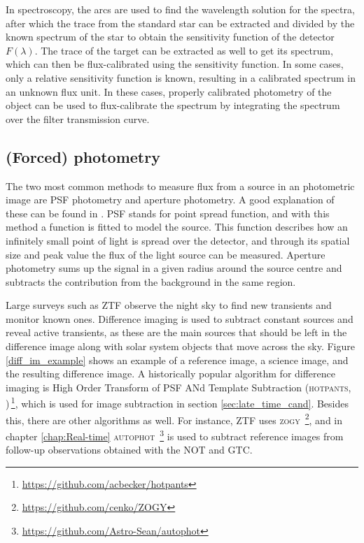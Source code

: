 \documentclass[a4paper,oneside,12pt, class=Latex/Classes/PhDthesisPSnPDF, crop=false]{standalone}
\begin{document}
In spectroscopy, the arcs are used to find the wavelength solution for the spectra, after which the trace from the standard star can be extracted and divided by the known spectrum of the star to obtain the sensitivity function of the detector $F(\lambda)$. The trace of the target can be extracted as well to get its spectrum, which can then be flux-calibrated using the sensitivity function. In some cases, only a relative sensitivity function is known, resulting in a calibrated spectrum in an unknown flux unit. In these cases, properly calibrated photometry of the object can be used to flux-calibrate the spectrum by integrating the spectrum over the filter transmission curve.


\subsection{(Forced) photometry}
The two most common methods to measure flux from a source in an photometric image are PSF photometry and aperture photometry. A good explanation of these can be found in \citet{Photometry_techniques}. PSF stands for point spread function, and with this method a function is fitted to model the source. This function describes how an infinitely small point of light is spread over the detector, and through its spatial size and peak value the flux of the light source can be measured. Aperture photometry sums up the signal in a given radius around the source centre and subtracts the contribution from the background in the same region.

Large surveys such as ZTF observe the night sky to find new transients and monitor known ones. Difference imaging is used to subtract constant sources and reveal active transients, as these are the main sources that should be left in the difference image along with solar system objects that move across the sky. Figure \ref{diff_im_example} shows an example of a reference image, a science image, and the resulting difference image. A historically popular algorithm for difference imaging is High Order Transform of PSF ANd Template Subtraction (\textsc{hotpants}, \citealt{HOTPANTS})\,\footnote{\url{https://github.com/acbecker/hotpants}}, which is used for image subtraction in section \ref{sec:late_time_cand}. Besides this, there are other algorithms as well. For instance, ZTF uses \textsc{zogy} \citep{ZOGY}\,\footnote{\url{https://github.com/cenko/ZOGY}}, and in chapter \ref{chap:Real-time} \textsc{autophot} \citep{Autophot}\,\footnote{\url{https://github.com/Astro-Sean/autophot}} is used to subtract reference images from follow-up observations obtained with the NOT and GTC.
\end{document}
